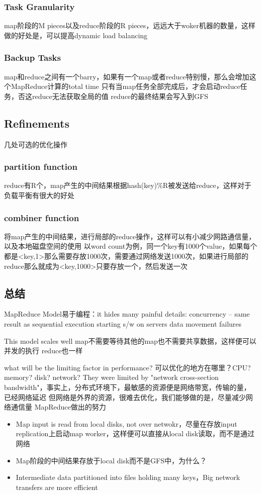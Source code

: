 \subsubsection{Task Granularity}
map阶段的M pieces以及reduce阶段的R pieces，远远大于woker机器的数量，这样做的好处是，可以提高dynamic load balancing

\subsubsection{Backup Tasks}
map和reduce之间有一个barry，如果有一个map或者reduce特别慢，那么会增加这个MapReduce计算的total time
只有当map任务全部完成后，才会启动reduce任务，否这reduce无法获取全局的值
reduce的最终结果会写入到GFS

\subsection{Refinements}
几处可选的优化操作
\subsubsection{partition function}
reduce有R个，map产生的中间结果根据hash(key)\%R被发送给reduce，这样对于负载平衡有很大的好处

\subsubsection{combiner function}
将map产生的中间结果，进行局部的reduce操作，这样可以有小减少网路通信量，以及本地磁盘空间的使用
以word count为例，同一个key有1000个value，如果每个都是<key,1>那么需要存放1000次，需要通过网络发送1000次，如果进行局部的reduce那么就成为<key,1000>只要存放一个，然后发送一次

\subsection{总结}
MapReduce Model易于编程：it hides many painful details:
concurrency -- same result as sequential execution
starting s/w on servers
data movement
failures

This model scales well
map不需要等待其他的map也不需要共享数据，这样便可以并发的执行
reduce也一样

what will be the limiting factor in performance?
可以优化的地方在哪里？CPU? memory? disk? network?
They were limited by "network cross-section bandwidth"，事实上，分布式环境下，最敏感的资源便是网络带宽，传输的量，已经网络延迟
但网络是外界的资源，很难去优化，我们能够做的是，尽量减少网络通信量
MapReduce做出的努力
\begin{itemize}
  \item Map input is read from local disks, not over netwokr，尽量在存放input replication上启动map worker，这样便可以直接从local disk读取，而不是通过网络
  \item Map阶段的中间结果存放于local disk而不是GFS中，为什么？
  \item Intermediate data partitioned into files holding many keys，Big network transfers are more efficient
\end{itemize}

